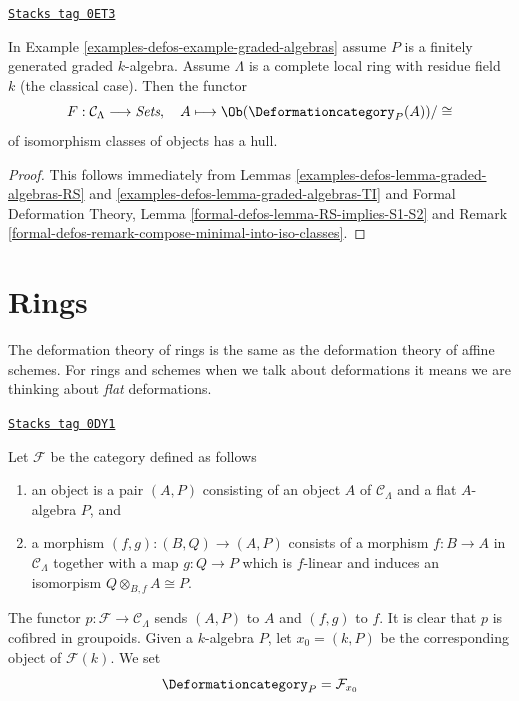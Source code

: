 \begin{lemma}
\label{examples-defos-lemma-graded-algebras-hull}
\href{https://stacks.math.columbia.edu/tag/0ET3}{\texttt{Stacks tag 0ET3}}

In Example \ref{examples-defos-example-graded-algebras} assume $P$ is a finitely generated
graded $k$-algebra. Assume $\Lambda$ is a complete local ring
with residue field $k$
(the classical case). Then the functor
$$
F : \mathcal{C}_\Lambda \longrightarrow \textit{Sets},\quad
A \longmapsto \Ob(\Deformationcategory_P(A))/\cong
$$
of isomorphism classes of objects has a hull.
\end{lemma}

\begin{proof}
This follows immediately from Lemmas \ref{examples-defos-lemma-graded-algebras-RS} and
\ref{examples-defos-lemma-graded-algebras-TI} and
Formal Deformation Theory, Lemma \ref{formal-defos-lemma-RS-implies-S1-S2}
and Remark \ref{formal-defos-remark-compose-minimal-into-iso-classes}.
\end{proof}

\section{Rings}
\label{examples-defos-section-rings}
The deformation theory of rings is the same as the deformation theory
of affine schemes. For rings and schemes when we talk about deformations
it means we are thinking about {\it flat} deformations.

\begin{example}[Rings]

\label{examples-defos-example-rings}
\href{https://stacks.math.columbia.edu/tag/0DY1}{\texttt{Stacks tag 0DY1}}

Let $\mathcal{F}$ be the category defined as follows
\begin{enumerate}
\item an object is a pair $(A, P)$ consisting of an
object $A$ of $\mathcal{C}_\Lambda$ and a flat $A$-algebra $P$, and
\item a morphism $(f, g) : (B, Q) \to (A, P)$ consists of
a morphism $f : B \to A$ in $\mathcal{C}_\Lambda$ together
with a map $g : Q \to P$ which is $f$-linear and induces an
isomorpism $Q \otimes_{B, f} A \cong P$.
\end{enumerate}
The functor $p : \mathcal{F} \to \mathcal{C}_\Lambda$ sends $(A, P)$
to $A$ and $(f, g)$ to $f$. It is clear that $p$ is cofibred in groupoids.
Given a $k$-algebra $P$, let $x_0 = (k, P)$ be the corresponding object
of $\mathcal{F}(k)$. We set
$$
\Deformationcategory_P = \mathcal{F}_{x_0}
$$
\end{example}

